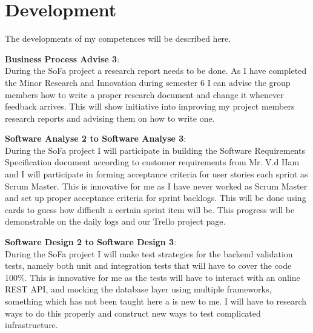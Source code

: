 \section{Development}
The developments of my competences will be described here.

\textbf{Business Process Advise 3}:\\
During the SoFa project a research report needs to be done. As I have completed the Minor Research and Innovation during semester 6 I can advise the group members how to write a proper research document and change it whenever feedback arrives. This will show initiative into improving my project members research reports and advising them on how to write one.

\textbf{Software Analyse 2 to Software Analyse 3}:\\
During the SoFa project I will participate in building the Software Requirements Specification document according to customer requirements from Mr. V.d Ham  and I will participate in forming acceptance criteria for user stories each sprint as Scrum Master. This is innovative for me as I have never worked as Scrum Master and set up proper acceptance criteria for sprint backlogs. This will be done using cards to guess how difficult a certain sprint item will be. This progress will be demonstrable on the daily logs and our Trello project page.

\textbf{Software Design 2 to Software Design 3}:\\
During the SoFa project I will make test strategies for the backend validation tests, namely both unit and integration tests that will have to cover the code 100\%. This is innovative for me as the tests will have to interact with an online REST API, and mocking the database layer using multiple frameworks, something which has not been taught here a is new to me. I will have to research ways to do this properly and construct new ways to test complicated infrastructure.